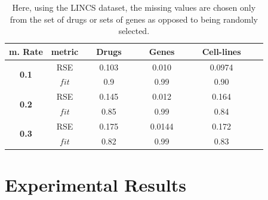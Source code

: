 \documentclass{article}
\begin{document}
\begin{table}[ht]
\renewcommand{\arraystretch}{0.7}
\renewcommand{\arraystretch}{0.7}
\centering
\resizebox{0.4\textwidth}{!}
{
\begin{tabular}{c|| c |c |c c c }

\textbf{m. Rate}& \textbf{metric}&{~~Drugs~~} &{~~Genes~~} &{~~Cell-lines~~} 
\\
\hline
\hline
\multirow{2}{*}{\textbf{0.1}}
&\cellcolor{black!05!white}
RSE
& \cellcolor{black!05!white}
0.103
& \cellcolor{black!05!white}

{0.010}
& \cellcolor{black!05!white}
{0.0974}

\\
&
$fit$
&{0.9}
& {0.99}
& {0.90}
\\
\hline
\hline
\multirow{2}{*}{\textbf{0.2}}
&\cellcolor{black!05!white}
RSE
& \cellcolor{black!05!white} 
{0.145}
&\cellcolor{black!05!white}

{0.012}
&\cellcolor{black!05!white}
{0.164}
\\
&$fit$
& {0.85}
&{0.99}
&{0.84}
\\
\hline
\hline
\multirow{2}{*}{\textbf{0.3}}
&\cellcolor{black!05!white}
RSE
& \cellcolor{black!05!white}
{0.175}
& \cellcolor{black!05!white}
{0.0144}
& \cellcolor{black!05!white}
{0.172}
\\
&
$fit$
&{0.82}
& {0.99}
& {0.83}
\\
\hline
\hline
\end{tabular}}
\vspace{0.09in}
\caption{
Here, using the LINCS dataset, the missing values are chosen only from the set of drugs or sets of genes as opposed to being randomly selected.}
\label{tab:cs}
\end{table} 




\section{Experimental Results}\label{sec:ER}
\end{document}
